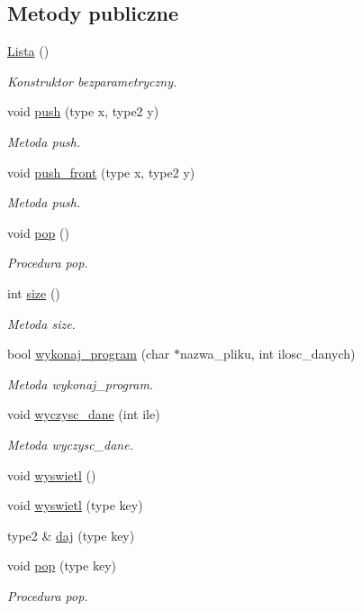 \subsection*{Metody publiczne}
\begin{DoxyCompactItemize}
\item 
\hyperlink{class_lista_a43eba77afd8dcde8d1492bf8ca283319}{Lista} ()
\begin{DoxyCompactList}\small\item\em Konstruktor bezparametryczny. \end{DoxyCompactList}\item 
void \hyperlink{class_lista_a3b89123537e441b622630a1654afff3c}{push} (type x, type2 y)
\begin{DoxyCompactList}\small\item\em Metoda push. \end{DoxyCompactList}\item 
void \hyperlink{class_lista_aa0a993823fa462fbe6d6072a61f1a1f3}{push\-\_\-front} (type x, type2 y)
\begin{DoxyCompactList}\small\item\em Metoda push. \end{DoxyCompactList}\item 
void \hyperlink{class_lista_ac3c0760924a0cae03f837a581640d32b}{pop} ()
\begin{DoxyCompactList}\small\item\em Procedura pop. \end{DoxyCompactList}\item 
int \hyperlink{class_lista_a2951b209d8977cc61a570ce46fff1e82}{size} ()
\begin{DoxyCompactList}\small\item\em Metoda size. \end{DoxyCompactList}\item 
bool \hyperlink{class_lista_af74ba5fb933184e05ec9daf952f4cf86}{wykonaj\-\_\-program} (char $\ast$nazwa\-\_\-pliku, int ilosc\-\_\-danych)
\begin{DoxyCompactList}\small\item\em Metoda wykonaj\-\_\-program. \end{DoxyCompactList}\item 
void \hyperlink{class_lista_aee6110c6d9d5b36fe5342f2f8968d5ad}{wyczysc\-\_\-dane} (int ile)
\begin{DoxyCompactList}\small\item\em Metoda wyczysc\-\_\-dane. \end{DoxyCompactList}\item 
void \hyperlink{class_lista_aca842e81998c231283f8d82b3c17fbc8}{wyswietl} ()
\item 
void \hyperlink{class_lista_a234e4c9e70c2d71c281173a5348032d0}{wyswietl} (type key)
\item 
type2 \& \hyperlink{class_lista_a00136dbc6562f02884a8b27bf98e51d8}{daj} (type key)
\item 
void \hyperlink{class_lista_ac5309fa4e772c9de87abdd0a752bafad}{pop} (type key)
\begin{DoxyCompactList}\small\item\em Procedura pop. \end{DoxyCompactList}\end{DoxyCompactItemize}
